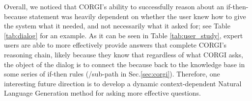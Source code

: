 Overall, we noticed that CORGI's ability to successfully reason about an if-then-because statement was heavily dependent on whether the user knew how to give the system what it needed, and not necessarily what it asked for; see Table \ref{tab:dialog} for an example. As it can be seen in Table \ref{tab:user_study}, expert users are able to more effectively provide answers that complete CORGI's reasoning chain, likely because they know that regardless of what CORGI asks, the object of the dialog is to connect the because \textGoal back to the knowledge base in some series of if-then rules (\textGoal/sub-\textGoal path in Sec.\ref{sec:corgi}). Therefore, one interesting future direction is to develop a dynamic context-dependent Natural Language Generation method for asking more effective questions.

